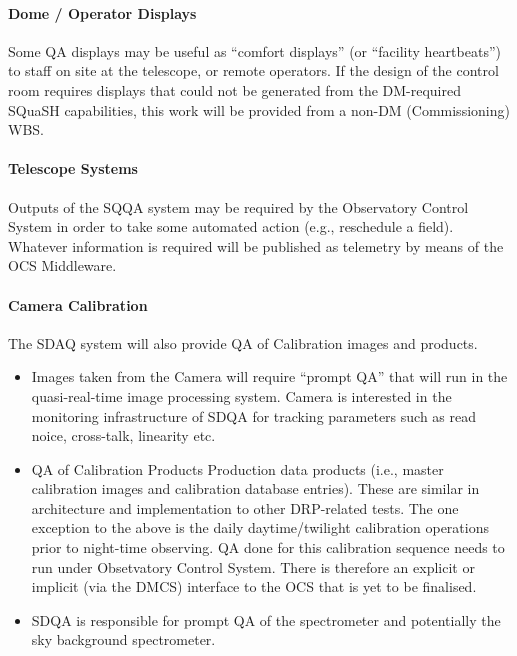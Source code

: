 \paragraph{Dome / Operator Displays}
\label{sec:qaDomeDisplay}

Some QA displays may be useful as ``comfort displays'' (or ``facility heartbeats'') to staff on site at the telescope, or remote operators. If the design of the control room requires displays that could not be generated from the DM-required SQuaSH capabilities, this work will be provided from a non-DM (Commissioning) WBS.

\paragraph{Telescope Systems}
\label{sec:qaTelescopeSystem}

Outputs of the SQQA system may be required by the Observatory Control System in order to take some automated action (e.g., reschedule a field). Whatever information is required will be published as telemetry by means of the OCS Middleware.

\paragraph{Camera Calibration}
\label{sec:qaTelescopeSystem}

The SDAQ system will also provide QA of Calibration images and products.

\begin{itemize}

\item Images taken from the Camera will require ``prompt QA'' that will run in the quasi-real-time image processing system. Camera is interested in the monitoring infrastructure of SDQA for tracking parameters such as read noice, cross-talk, linearity etc.

\item QA of Calibration Products Production data products (i.e., master calibration images and calibration database entries). These are similar in architecture and implementation to other DRP-related tests. The one exception to the above is the daily daytime/twilight calibration operations prior to night-time observing. QA done for this calibration sequence needs to run under Obsetvatory Control System. There is therefore an explicit or implicit (via the DMCS) interface to the OCS that is yet to be finalised. 

\item SDQA is responsible for prompt QA of the spectrometer and potentially the sky background spectrometer. 

\end{itemize}

